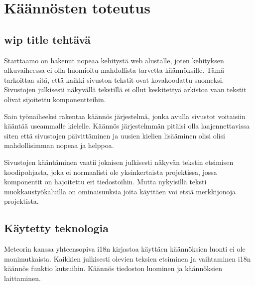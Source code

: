 \documentclass[11pt,a4paper,titlepage,oneside]{article}
\begin{document}
\newpage






\section{Käännösten toteutus}

\subsection{wip title tehtävä}


Starttaamo on hakenut nopeaa kehitystä web alustalle, joten kehityksen alkuvaiheessa 
ei olla huomioitu mahdollista tarvetta käännöksille. 
Tämä tarkoittaa sitä, että kaikki sivuston tekstit ovat kovakoodattu suomeksi.
Sivustojen julkisesti näkyvällä tekstillä ei ollut keskitettyä arkistoa vaan tekstit olivat sijoitettu komponentteihin.
\medskip

Sain työnaiheeksi rakentaa käännös järjestelmä, jonka avulla sivustot voitaisiin kääntää useammalle kielelle.
Käännös järjestelmmän pitäisi olla laajennettavissa siten että sivustojen päivittäminen ja uusien kielien lisääminen olisi 
olisi mahdollisimman nopeaa ja helppoa.\\
\medskip




Sivustojen kääntäminen vaatii jokaisen julkisesti näkyvän tekstin etsimisen koodipohjasta, 
joka ei normaalisti ole yksinkertaista projektissa, jossa komponentit on hajoitettu eri tiedostoihin.
Mutta nykyisillä teksti muokkaustyökaluilla on ominaisuuksia joita käyttäen voi etsiä merkkijonoja projektista.





\subsection{Käytetty teknologia}
Meteorin kanssa yhteensopiva i18n kirjastoa käyttäen käännöksien luonti ei ole monimutkaista.
Kaikkien julkisesti olevien teksien etsiminen ja vaihtaminen i18n käännös funktio kutsuihin.
Käännös tiedoston luominen ja käännöksien laittaminen.
\bigskip
\end{document}
